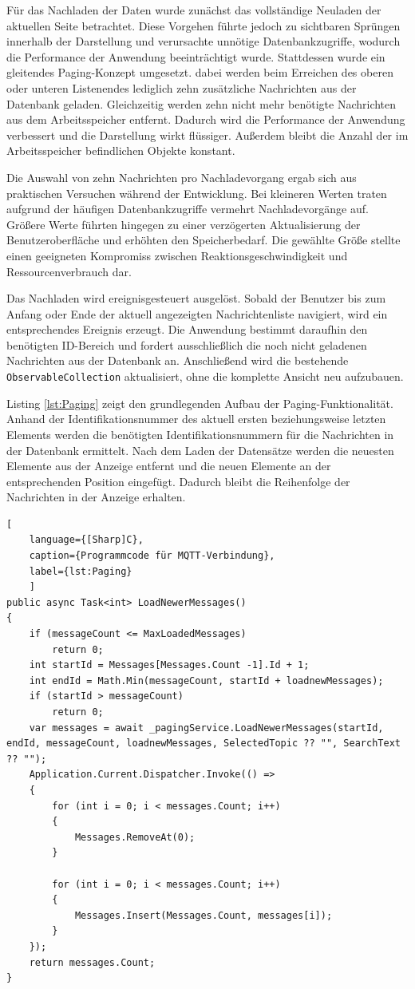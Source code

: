 Für das Nachladen der Daten wurde zunächst das vollständige Neuladen der aktuellen Seite betrachtet. Diese Vorgehen führte jedoch zu sichtbaren Sprüngen innerhalb der Darstellung und verursachte unnötige Datenbankzugriffe, wodurch die Performance der Anwendung beeinträchtigt wurde. Stattdessen wurde ein gleitendes Paging-Konzept umgesetzt. dabei werden beim Erreichen des oberen oder unteren Listenendes lediglich zehn zusätzliche Nachrichten aus der Datenbank geladen. Gleichzeitig werden zehn nicht mehr benötigte Nachrichten aus dem Arbeitsspeicher entfernt. Dadurch wird die Performance der Anwendung verbessert und die Darstellung wirkt flüssiger. Außerdem bleibt die Anzahl der im Arbeitsspeicher befindlichen Objekte konstant.

Die Auswahl von zehn Nachrichten pro Nachladevorgang ergab sich aus praktischen Versuchen während der Entwicklung. Bei kleineren Werten traten aufgrund der häufigen Datenbankzugriffe vermehrt Nachladevorgänge auf. Größere Werte führten hingegen zu einer verzögerten Aktualisierung der Benutzeroberfläche und erhöhten den Speicherbedarf. Die gewählte Größe stellte einen geeigneten Kompromiss zwischen Reaktionsgeschwindigkeit und Ressourcenverbrauch dar.

Das Nachladen wird ereignisgesteuert ausgelöst. Sobald der Benutzer bis zum Anfang oder Ende der aktuell angezeigten Nachrichtenliste navigiert, wird ein entsprechendes Ereignis erzeugt. Die Anwendung bestimmt daraufhin den benötigten ID-Bereich und fordert ausschließlich die noch nicht geladenen Nachrichten aus der Datenbank an. Anschließend wird die bestehende \lstinline{ObservableCollection} aktualisiert, ohne die komplette Ansicht neu aufzubauen.

Listing \ref{lst:Paging} zeigt den grundlegenden Aufbau der Paging-Funktionalität. Anhand der Identifikationsnummer des aktuell ersten beziehungsweise letzten Elements werden die benötigten Identifikationsnummern für die Nachrichten in der Datenbank ermittelt. Nach dem Laden der Datensätze werden die neuesten Elemente aus der Anzeige entfernt und die neuen Elemente an der entsprechenden Position eingefügt. Dadurch bleibt die Reihenfolge der Nachrichten in der Anzeige erhalten.

\begin{lstlisting}[
    language={[Sharp]C},
    caption={Programmcode für MQTT-Verbindung},
    label={lst:Paging}
    ]
public async Task<int> LoadNewerMessages()
{
    if (messageCount <= MaxLoadedMessages)
        return 0;
    int startId = Messages[Messages.Count -1].Id + 1;
    int endId = Math.Min(messageCount, startId + loadnewMessages);
    if (startId > messageCount)
        return 0;
    var messages = await _pagingService.LoadNewerMessages(startId, endId, messageCount, loadnewMessages, SelectedTopic ?? "", SearchText ?? "");
    Application.Current.Dispatcher.Invoke(() =>
    {
        for (int i = 0; i < messages.Count; i++)
        {
            Messages.RemoveAt(0);
        }

        for (int i = 0; i < messages.Count; i++)
        {
            Messages.Insert(Messages.Count, messages[i]);
        }
    });
    return messages.Count;
}
\end{lstlisting}

